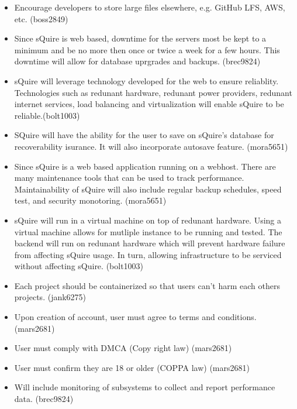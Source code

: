 \documentclass[11pt]{report}
\begin{document}
\begin{itemize}
            \item Encourage developers to store large files elsewhere, e.g. GitHub LFS, AWS, etc. (boss2849)
            \item Since sQuire is web based, downtime for the servers most be kept to a minimum and be no more then once or twice a week for a few hours. This downtime will allow for database uprgrades and backups. (brec9824)
             \item sQuire will leverage technology developed for the web to ensure reliablity. Technologies such as redunant hardware, redunant power providers, redunant internet services, load balancing and virtualization will enable sQuire to be reliable.(bolt1003)
            \item SQuire will have the ability for the user to save on sQuire's database for recoverability isurance. It will also incorporate autosave feature. (mora5651)
            \item Since sQuire is a web based application running on a webhost. There are 
            many maintenance tools that can be used to track performance. Maintainability of sQuire will also include regular backup schedules, speed test, and security monotoring. (mora5651)
             \item sQuire will run in a virtual machine on top of redunant hardware. Using a virtual machine allows for mutliple instance to be running and tested. The backend will run on redunant hardware which will prevent hardware failure from affecting sQuire usage. In turn, allowing infrastructure to be serviced without affecting sQuire. (bolt1003)
            \item Each project should be containerized so that users can't harm each others projects. (jank6275)
            \item Upon creation of account, user must agree to terms and conditions. (mars2681)
            \item User must comply with DMCA (Copy right law) (mars2681)
            \item User must confirm they are 18 or older (COPPA law) (mars2681)
            \item Will include monitoring of subsystems to collect and report performance data. (brec9824)

\end{itemize}
\end{document}
